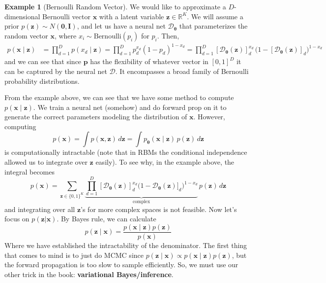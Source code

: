 \documentclass{article}
\theoremstyle{definition}
\newtheorem{example}{Example}[section]
\theoremstyle{remark}
\theoremstyle{definition}
\begin{document}
\begin{example}[Bernoulli Random Vector] 
    We would like to approximate a $D$-dimensional Bernoulli vector $\mathbf{x}$ with a latent variable $\mathbf{z} \in \mathbb{R}^K$. We will assume a prior $p(\mathbf{z}) \sim N(\mathbf{0}, \mathbf{I})$, and let us have a neural net $\mathcal{D}_{\boldsymbol{\theta}}$ that parameterizes the random vector $\mathbf{x}$, where $x_i \sim \mathrm{Bernoulli}(p_i)$ for $p_i$. Then,
\begin{align*}
    p(\mathbf{x} \mid \mathbf{z}) & = \prod_{d=1}^D p(x_d \mid \mathbf{z}) = \prod_{d=1}^D p_d^{x_d} (1 - p_d)^{1 - x_d} = \prod_{d=1}^D [\mathcal{D}_{\boldsymbol{\theta}} (\mathbf{z})]_d^{x_d} \, \big( 1 - [\mathcal{D}_{\boldsymbol{\theta}} (\mathbf{z})]_d\big)^{1 - x_d}
\end{align*} 
and we can see that since $\mathbf{p}$ has the flexibility of whatever vector in $[0, 1]^D$ it can be captured by the neural net $\mathcal{D}$. It encompasses a broad family of Bernoulli probability distributions. 
\end{example}

From the example above, we can see that we have some method to compute $p(\mathbf{x} \mid \mathbf{z})$. We train a neural net (somehow) and do forward prop on it to generate the correct parameters modeling the distribution of $\mathbf{x}$. However, computing 
\[p(\mathbf{x}) = \int p(\mathbf{x}, \mathbf{z}) \,d\mathbf{z} = \int p_{\boldsymbol{\theta}} (\mathbf{x} \mid \mathbf{z}) \, p(\mathbf{z}) \,d\mathbf{z} \]
is computationally intractable (note that in RBMs the conditional independence allowed us to integrate over $\mathbf{z}$ easily). To see why, in the example above, the integral becomes
\[p(\mathbf{x}) = \sum_{\mathbf{z} \in \{0, 1\}^K} \underbrace{\prod_{d=1}^D [\mathcal{D}_{\boldsymbol{\theta}} (\mathbf{z})]_d^{x_d} \big( 1 - \mathcal{D}_{\boldsymbol{\theta}} (\mathbf{z})]_d \big)^{1 - x_d}}_{\text{complex}} \, p(\mathbf{z}) \, d\mathbf{z}\]
and integrating over all $\mathbf{z}$'s for more complex spaces is not feasible. Now let's focus on $p(\mathbf{z} | \mathbf{x})$. By Bayes rule, we can calculate 
\[p(\mathbf{z} \mid \mathbf{x}) = \frac{p(\mathbf{x} \mid \mathbf{z}) p(\mathbf{z})}{p(\mathbf{x})}\]
Where we have established the intractability of the denominator. The first thing that comes to mind is to just do MCMC since $p(\mathbf{z} \mid \mathbf{x}) \propto p(\mathbf{x} \mid \mathbf{z}) p(\mathbf{z})$, but the forward propagation is too slow to sample efficiently. So, we must use our other trick in the book: \textbf{variational Bayes/inference}. 
\end{document}
